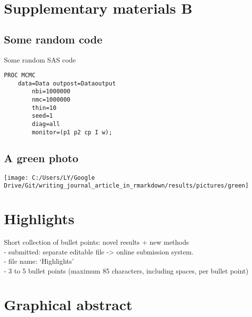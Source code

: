 \documentclass[review]{elsarticle} %
\let\origfigure\figure
\let\endorigfigure\endfigure
\renewenvironment{figure}[1][2] {
    \expandafter\origfigure\expandafter[H]
} {
    \endorigfigure
}
\begin{document}
\section{Supplementary materials B}\label{appendixB}

\subsection{Some random code}\label{some-random-code}

Some random SAS code

\begin{verbatim}
PROC MCMC 
    data=Data outpost=Dataoutput 
        nbi=1000000 
        nmc=1000000
        thin=10
        seed=1
        diag=all
        monitor=(p1 p2 cp I w); 
\end{verbatim}

\subsection{A green photo}\label{a-green-photo}

\begin{figure}

{\centering \texttt{[image: C:/Users/LY/Google Drive/Git/writing\_journal\_article\_in\_rmarkdown/results/pictures/green]} 

}

\caption{A green photo}\label{fig:green}
\end{figure}

\newpage

\section*{Highlights}\label{highlight}

Short collection of bullet points: novel results + new methods\\
- submitted: separate editable file -\textgreater{} online submission
system.\\
- file name: `Highlights'\\
- 3 to 5 bullet points (maximum 85 characters, including spaces, per
bullet point)

\section*{Graphical abstract}\label{graphic}
\end{document}
